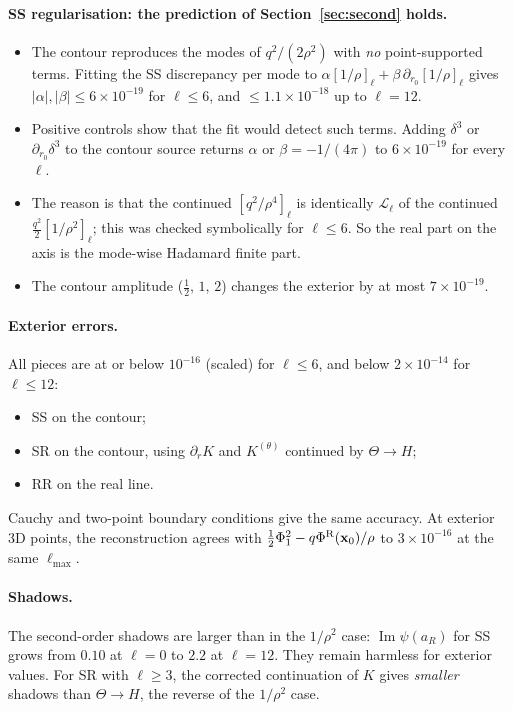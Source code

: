 \documentclass[11pt,a4paper]{article}
\renewcommand{\Im}{\operatorname{Im}}
\newcommand{\Lop}{\mathcal{L}_\ell}
\newcommand{\PhiR}{\Phi^{\rm R}}
\newcommand{\x}{\mathbf{x}}
\begin{document}
\paragraph{SS regularisation: the prediction of Section~\ref{sec:second} holds.}
\begin{itemize}[nosep]
\item The contour reproduces the modes of $q^2/(2\rho^2)$ with \emph{no} point-supported terms.
  Fitting the SS discrepancy per mode to $\alpha[1/\rho]_\ell+\beta\,\partial_{r_0}[1/\rho]_\ell$ gives $|\alpha|,|\beta|\le6\times10^{-19}$ for $\ell\le6$, and $\le1.1\times10^{-18}$ up to $\ell=12$.
\item Positive controls show that the fit would detect such terms.
  Adding $\delta^3$ or $\partial_{r_0}\delta^3$ to the contour source returns $\alpha$ or $\beta=-1/(4\pi)$ to $6\times10^{-19}$ for every $\ell$.
\item The reason is that the continued $[q^2/\rho^4]_\ell$ is identically $\Lop$ of the continued $\frac{q^2}{2}[1/\rho^2]_\ell$; this was checked symbolically for $\ell\le6$.
  So the real part on the axis is the mode-wise Hadamard finite part.
\item The contour amplitude ($\tfrac12$, $1$, $2$) changes the exterior by at most $7\times10^{-19}$.
\end{itemize}

\paragraph{Exterior errors.}
All pieces are at or below $10^{-16}$ (scaled) for $\ell\le6$, and below $2\times10^{-14}$ for $\ell\le12$:
\begin{itemize}[nosep]
\item SS on the contour;
\item SR on the contour, using $\partial_rK$ and $K^{(\theta)}$ continued by $\Theta\to H$;
\item RR on the real line.
\end{itemize}
Cauchy and two-point boundary conditions give the same accuracy.
At exterior 3D points, the reconstruction agrees with $\tfrac12\Phi_1^2-q\PhiR(\x_0)/\rho$ to $3\times10^{-16}$ at the same $\ell_{\max}$.

\paragraph{Shadows.}
The second-order shadows are larger than in the $1/\rho^2$ case: $\Im\psi(a_R)$ for SS grows from $0.10$ at $\ell=0$ to $2.2$ at $\ell=12$.
They remain harmless for exterior values.
For SR with $\ell\ge3$, the corrected continuation of $K$ gives \emph{smaller} shadows than $\Theta\to H$, the reverse of the $1/\rho^2$ case.
\end{document}
